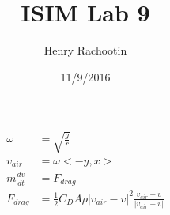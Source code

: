 \documentclass[11pt]{article}
\title{ISIM Lab 9}
\author{Henry Rachootin}
\date{11/9/2016}
\begin{document}
\begin{align*}
\omega&=\sqrt{\frac{g}{r}}\\
v_{air}&=\omega <-y,x>\\
m\frac{dv}{dt} &= F_{drag}\\
F_{drag}&=\frac{1}{2}C_{D}A\rho\left|v_{air}-v\right|^2\frac{v_{air}-v}{\left|v_{air}-v\right|}
\end{align*}
\end{document}
